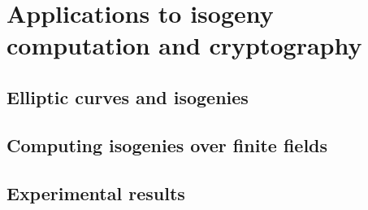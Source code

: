 \part[Applications to isogenies and cryptography]{Applications to isogeny computation and cryptography}
\label{part:appl-isog-comp}
\chapter{Elliptic curves and isogenies}
\label{cha:ellipt-curv-isog}


\chapter{Computing isogenies over finite fields}
\label{cha:algor-small-char}








\chapter{Experimental results}
\label{cha:experimental-results}




%

